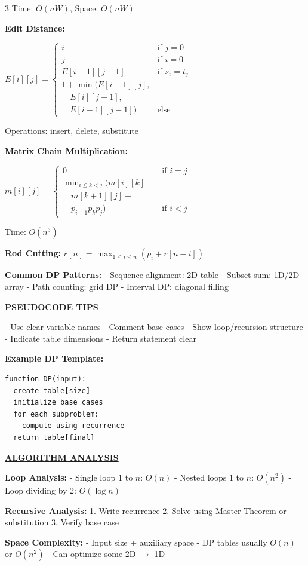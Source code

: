 \documentclass[7pt,landscape]{article}
\newcommand{\sect}[1]{\vspace{1mm}\textbf{\underline{#1}}\vspace{0.5mm}}
\begin{document}
\begin{multicols}{3}
Time: $O(nW)$, Space: $O(nW)$

\textbf{Edit Distance:}

$E[i][j] = \begin{cases} 
i & \text{if } j=0 \\ 
j & \text{if } i=0 \\ 
E[i-1][j-1] & \text{if } s_i = t_j \\ 
1 + \min(E[i-1][j], & \\
\quad E[i][j-1], & \\
\quad E[i-1][j-1]) & \text{else} 
\end{cases}$

Operations: insert, delete, substitute

\textbf{Matrix Chain Multiplication:}

$m[i][j] = \begin{cases} 
0 & \text{if } i=j \\ 
\min_{i \leq k < j}(m[i][k] + & \\
\quad m[k+1][j] + & \\
\quad p_{i-1}p_kp_j) & \text{if } i<j 
\end{cases}$

Time: $O(n^3)$

\textbf{Rod Cutting:} $r[n] = \max_{1\leq i \leq n}(p_i + r[n-i])$

\textbf{Common DP Patterns:}
- Sequence alignment: 2D table
- Subset sum: 1D/2D array
- Path counting: grid DP
- Interval DP: diagonal filling

\sect{PSEUDOCODE TIPS}

- Use clear variable names
- Comment base cases
- Show loop/recursion structure
- Indicate table dimensions
- Return statement clear

\textbf{Example DP Template:}
\begin{verbatim}
function DP(input):
  create table[size]
  initialize base cases
  for each subproblem:
    compute using recurrence
  return table[final]
\end{verbatim}

\sect{ALGORITHM ANALYSIS}

\textbf{Loop Analysis:}
- Single loop $1$ to $n$: $O(n)$
- Nested loops $1$ to $n$: $O(n^2)$
- Loop dividing by 2: $O(\log n)$

\textbf{Recursive Analysis:}
1. Write recurrence
2. Solve using Master Theorem or substitution
3. Verify base case

\textbf{Space Complexity:}
- Input size + auxiliary space
- DP tables usually $O(n)$ or $O(n^2)$
- Can optimize some 2D $\to$ 1D


\end{multicols}
\end{document}
